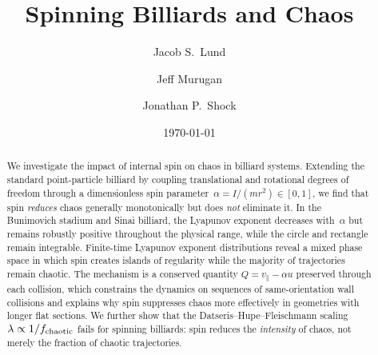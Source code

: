 \documentclass[aps,prd,twocolumn,superscriptaddress,nofootinbib,floatfix]{revtex4-2}
\begin{document}
\title{Spinning Billiards and Chaos}

\author{Jacob S.~Lund}

\author{Jeff Murugan}

\author{Jonathan P.~Shock}

\date{\today}

\begin{abstract}
We investigate the impact of internal spin on chaos in billiard systems. Extending the standard point-particle billiard by coupling translational and rotational degrees of freedom through a dimensionless spin parameter~$\alpha = I/(mr^2) \in [0,1]$, we find that spin \emph{reduces} chaos generally monotonically but does \emph{not} eliminate it. In the Bunimovich stadium and Sinai billiard, the Lyapunov exponent decreases with~$\alpha$ but remains robustly positive throughout the physical range, while the circle and rectangle remain integrable. Finite-time Lyapunov exponent distributions reveal a mixed phase space in which spin creates islands of regularity while the majority of trajectories remain chaotic. The mechanism is a conserved quantity $Q = v_\parallel - \alpha u$ preserved through each collision, which constrains the dynamics on sequences of same-orientation wall collisions and explains why spin suppresses chaos more effectively in geometries with longer flat sections. We further show that the Datseris--Hupe--Fleischmann scaling $\lambda \propto 1/f_{\rm chaotic}$ fails for spinning billiards: spin reduces the \emph{intensity} of chaos, not merely the fraction of chaotic trajectories.
\end{abstract}
\end{document}

